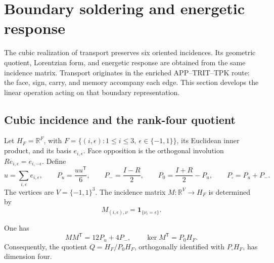 
\section{Boundary soldering and energetic response}
\label{vii:sec:pantalla-respuesta}

The cubic realization of transport preserves six oriented incidences.
Its geometric quotient, Lorentzian form, and energetic response
are obtained from the same incidence matrix. Transport originates in
the enriched APP--TRIT--TPK route: the face, sign, carry, and
memory accompany each edge. This section develops the
linear operation acting on that boundary representation.

\subsection{Cubic incidence and the rank-four quotient}
\label{vii:sec:cociente-pantalla}

Let \(H_F=\mathbb R^F\), with
\(F=\{(i,\epsilon):1\leq i\leq3,\ \epsilon\in\{-1,1\}\}\),
its Euclidean inner product, and its basis \(e_{i,\epsilon}\).
Face opposition is the orthogonal involution
\(Re_{i,\epsilon}=e_{i,-\epsilon}\). Define
\[
 u=\sum_{i,\epsilon}e_{i,\epsilon},\qquad
 P_u=\frac{uu^{\mathsf T}}6,\qquad P_-=\frac{I-R}{2},\qquad
 P_0=\frac{I+R}{2}-P_u,\qquad P_\square=P_u+P_-.
\]
The vertices are \(V=\{-1,1\}^3\). The incidence matrix
\(M:\mathbb R^V\longrightarrow H_F\) is determined by
\[
 M_{(i,\epsilon),\nu}=\mathbf1_{\{\nu_i=\epsilon\}}.
\]

\begin{proposition}
\label{vii:prop:incidencia}
One has
\[
 MM^{\mathsf T}=12P_u+4P_-,
 \qquad
 \ker M^{\mathsf T}=P_0H_F.
\]
Consequently, the quotient
\(Q=H_F/P_0H_F\), orthogonally identified with
\(P_\square H_F\), has dimension four.
\end{proposition}

